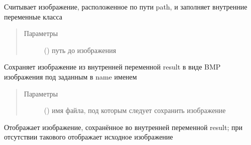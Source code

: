 \documentclass[letterpaper,10pt,russian]{sphinxmanual}
\begin{document}
\begin{fulllineitems}
\begin{fulllineitems}
\end{fulllineitems}


\begin{fulllineitems}
\label{\detokenize{BaseImage:core.LabImage.read}}
Считывает изображение, расположенное по пути path, и заполняет внутренние переменные класса
\begin{quote}\begin{description}
\item[{Параметры}] \leavevmode
{} () \textendash{} путь до изображения

\end{description}\end{quote}

\end{fulllineitems}


\begin{fulllineitems}
\label{\detokenize{BaseImage:core.LabImage.save}}
Сохраняет изображение из внутренней переменной result в виде BMP изображения под заданным в name именем
\begin{quote}\begin{description}
\item[{Параметры}] \leavevmode
{} () \textendash{} имя файла, под которым следует сохранить изображение

\end{description}\end{quote}

\end{fulllineitems}


\begin{fulllineitems}
\label{\detokenize{BaseImage:core.LabImage.show}}
Отображает изображение, сохранённое во внутренней переменной result;
при отсутствии такового отображает исходное изображение

\end{fulllineitems}


\end{fulllineitems}
\end{document}
